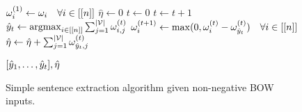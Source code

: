 
\begin{figure}
  \begin{algorithmic}[1]
   
      \State $\omega_i^{(1)}  \gets \omega_i \quad \forall i \in [[n]]$
      \State $\hat{\eta} \gets 0$
      \State $t \gets 0$
        \State $t \gets t + 1$
        \State $\hat{y}_t \gets \operatorname{arg max}_{i \in [[n]]}
            \sum_{j=1}^{|\mathcal{V}|} \omega^{(t)}_{i,j}$
        \State $\omega_i^{(t+1)} \gets \max(0, \omega_i^{(t)} - \omega^{(t)}_{\hat{y}_t} )\quad  \forall i \in [[n]]$
        \State $\hat{\eta} \gets \hat{\eta} + \sum_{j=1}^{|\mathcal{V}|} \omega_{\hat{y}_t,j}^{(t)}$
         

      \EndWhile
        \State \Return $[\hat{y}_1,\ldots,\hat{y}_t], \hat{\eta}$ 
    \EndProcedure
  \end{algorithmic}
\caption{Simple sentence extraction algorithm given non-negative BOW inputs.}
\label{alg:wimp_ext_alg}
\end{figure}
